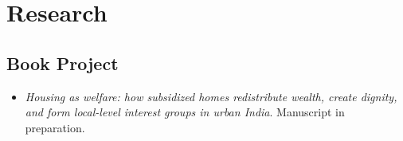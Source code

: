 \documentclass[11pt]{article}
\begin{document}
	
\vspace{2mm}
\color{MidnightBlue}

\section*{Research}
\color{Black}

\subsection*{Book Project}
\begin{itemize}
	\item[]\textit{Housing as welfare: how subsidized homes  redistribute wealth, create dignity, and form local-level interest groups in urban India}. Manuscript in preparation.


\end{itemize}
\end{document}
